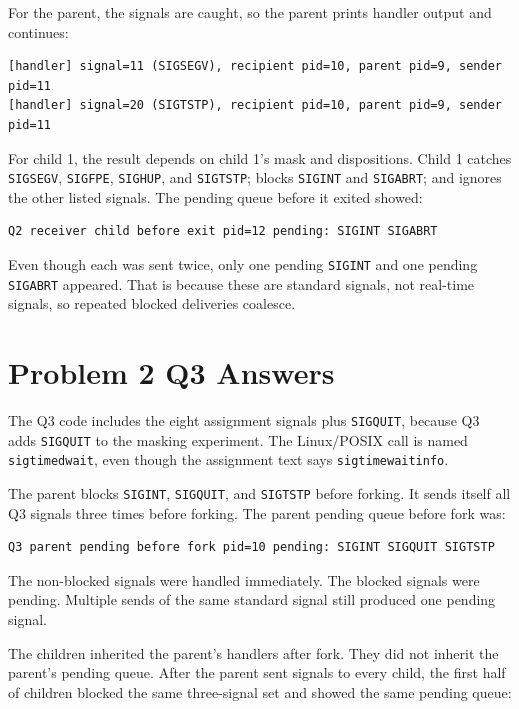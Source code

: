 \documentclass[11pt]{article}
\begin{document}
For the parent, the signals are caught, so the parent prints handler output and
continues:

\begin{verbatim}
[handler] signal=11 (SIGSEGV), recipient pid=10, parent pid=9, sender pid=11
[handler] signal=20 (SIGTSTP), recipient pid=10, parent pid=9, sender pid=11
\end{verbatim}

For child 1, the result depends on child 1's mask and dispositions. Child 1 catches
\texttt{SIGSEGV}, \texttt{SIGFPE}, \texttt{SIGHUP}, and \texttt{SIGTSTP}; blocks
\texttt{SIGINT} and \texttt{SIGABRT}; and ignores the other listed signals. The
pending queue before it exited showed:

\begin{verbatim}
Q2 receiver child before exit pid=12 pending: SIGINT SIGABRT
\end{verbatim}

Even though each was sent twice, only one pending \texttt{SIGINT} and one pending
\texttt{SIGABRT} appeared. That is because these are standard signals, not real-time
signals, so repeated blocked deliveries coalesce.

\section{Problem 2 Q3 Answers}

The Q3 code includes the eight assignment signals plus \texttt{SIGQUIT}, because Q3
adds \texttt{SIGQUIT} to the masking experiment. The Linux/POSIX call is named
\texttt{sigtimedwait}, even though the assignment text says \texttt{sigtimewaitinfo}.

The parent blocks \texttt{SIGINT}, \texttt{SIGQUIT}, and \texttt{SIGTSTP} before
forking. It sends itself all Q3 signals three times before forking. The parent
pending queue before fork was:

\begin{verbatim}
Q3 parent pending before fork pid=10 pending: SIGINT SIGQUIT SIGTSTP
\end{verbatim}

The non-blocked signals were handled immediately. The blocked signals were pending.
Multiple sends of the same standard signal still produced one pending signal.

The children inherited the parent's handlers after fork. They did not inherit the
parent's pending queue. After the parent sent signals to every child, the first half
of children blocked the same three-signal set and showed the same pending queue:
\end{document}
